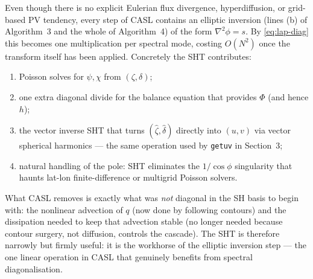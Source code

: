 \documentclass[11pt]{article}
\begin{document}
Even though there is no explicit Eulerian flux divergence, hyperdiffusion,
or grid-based PV tendency, every step of CASL contains an elliptic
inversion (lines (b) of Algorithm~3 and the whole of Algorithm~4) of
the form $\nabla^{2}\phi = s$.  By \eqref{eq:lap-diag} this becomes one
multiplication per spectral mode, costing $O(N^{2})$ once the transform
itself has been applied.  Concretely the SHT contributes:
\begin{enumerate}
    \item Poisson solves for $\psi,\chi$ from $(\zeta,\delta)$;
    \item one extra diagonal divide for the balance equation that
          provides $\Phi$ (and hence $h$);
    \item the vector inverse SHT that turns
          $(\hat\zeta,\hat\delta)$ directly into $(u,v)$ via vector
          spherical harmonics --- the same operation used by
          \texttt{getuv} in Section~3;
    \item natural handling of the pole: SHT eliminates the
          $1/\cos\phi$ singularity that haunts lat-lon
          finite-difference or multigrid Poisson solvers.
\end{enumerate}
What CASL removes is exactly what was \emph{not} diagonal in the SH
basis to begin with: the nonlinear advection of $q$ (now done by
following contours) and the dissipation needed to keep that advection
stable (no longer needed because contour surgery, not diffusion,
controls the cascade).  The SHT is therefore narrowly but firmly
useful: it is the workhorse of the elliptic inversion step --- the one
linear operation in CASL that genuinely benefits from spectral
diagonalisation.
\end{document}
